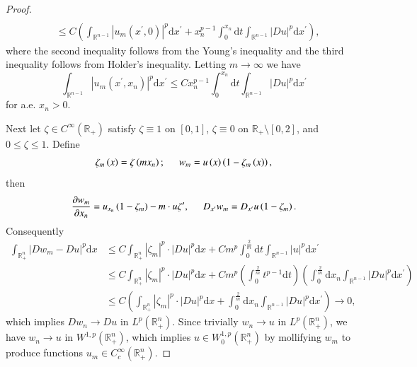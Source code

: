 \begin{proof}
$$\begin{aligned}
\\
&\le C\left( \int_{\mathbb{R} ^{n-1}}{\left| u_m\left( x^{\prime},0 \right) \right|^p\mathrm{d}x^{\prime}}+x_{n}^{p-1}\int_0^{x_n}{\mathrm{d}t\int_{\mathbb{R} ^{n-1}}{\left| Du \right|^p\mathrm{d}x^{\prime}}} \right) ,
\end{aligned}
$$
where the second inequality follows from the Young's inequality and the third inequality follows from Holder's inequality. Letting $m\to\infty$ we have 
$$
\int_{\mathbb{R} ^{n-1}}{\left| u_m\left( x^{\prime},x_n \right) \right|^p\mathrm{d}x^{\prime}}\le Cx_{n}^{p-1}\int_0^{x_n}{\mathrm{d}t\int_{\mathbb{R} ^{n-1}}{\left| Du \right|^p\mathrm{d}x^{\prime}}}
$$
for a.e. $x_n>0$.\par
Next let $\zeta\in C^\infty(\mathbb{R}_+)$ satisfy $\zeta\equiv 1$ on $[0,1]$, $\zeta\equiv 0$ on $\mathbb{R}_+\setminus[0,2]$, and $0\le\zeta\le 1$. Define 
$$
\zeta _m\left( x \right) =\zeta \left( mx_n \right) ;\hspace{0.5cm}w_m=u\left( x \right) \left( 1-\zeta _m\left( x \right) \right) ,
$$
then 
$$
\frac{\partial w_m}{\partial x_n}=u_{x_n}\left( 1-\zeta _m \right) -m\cdot u\zeta ^{\prime},\hspace{0.5cm}D_{x^{\prime}}w_m=D_{x^{\prime}}u\left( 1-\zeta _m \right) .
$$
Consequently 
$$
\begin{aligned}
\int_{\mathbb{R} _{+}^{n}}{\left| Dw_m-Du \right|^p\mathrm{d}x}&\le C\int_{\mathbb{R} _{+}^{n}}{\left| \zeta _m \right|^p\cdot \left| Du \right|^p\mathrm{d}x}+Cm^p\int_0^{\frac{2}{m}}{\mathrm{d}t\int_{\mathbb{R} ^{n-1}}{\left| u \right|^p\mathrm{d}x^{\prime}}}
\\
&\le C\int_{\mathbb{R} _{+}^{n}}{\left| \zeta _m \right|^p\cdot \left| Du \right|^p\mathrm{d}x}+Cm^p\left( \int_0^{\frac{2}{m}}{t^{p-1}\mathrm{d}t} \right) \left( \int_0^{\frac{2}{m}}{\mathrm{d}x_n\int_{\mathbb{R} ^{n-1}}{\left| Du \right|^p\mathrm{d}x^{\prime}}} \right) 
\\
&\le C\left( \int_{\mathbb{R} _{+}^{n}}{\left| \zeta _m \right|^p\cdot \left| Du \right|^p\mathrm{d}x}+\int_0^{\frac{2}{m}}{\mathrm{d}x_n\int_{\mathbb{R} ^{n-1}}{\left| Du \right|^p\mathrm{d}x^{\prime}}} \right) \rightarrow 0,
\end{aligned}
$$
which implies $Dw_n\to Du$ in $L^p(\mathbb{R}_+^n)$. Since trivially $w_n\to u$ in $L^p(\mathbb{R}_+^n)$, we have $w_n\to u$ in $W^{1,p}(\mathbb{R}_+^n)$, which implies $u\in W^{1,p}_0(\mathbb{R}_+^n)$ by mollifying $w_m$ to produce functions $u_m\in C_c^\infty(\mathbb{R}_+^n)$.
\end{proof}

